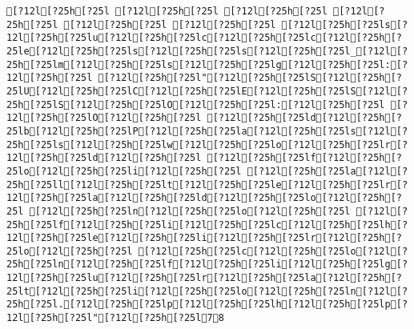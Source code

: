 \documentclass{scrartcl}
\begin{document}
\begin{Verbatim}
[?12l[?25h[?25l [?12l[?25h[?25l [?12l[?25h[?25l [?12l[?25h[?25l [?12l[?25h[?25l [?12l[?25h[?25l [?12l[?25h[?25ls[?12l[?25h[?25lu[?12l[?25h[?25lc[?12l[?25h[?25lc[?12l[?25h[?25le[?12l[?25h[?25ls[?12l[?25h[?25ls[?12l[?25h[?25l_[?12l[?25h[?25lm[?12l[?25h[?25ls[?12l[?25h[?25lg[?12l[?25h[?25l:[?12l[?25h[?25l [?12l[?25h[?25l"[?12l[?25h[?25lS[?12l[?25h[?25lU[?12l[?25h[?25lC[?12l[?25h[?25lE[?12l[?25h[?25lS[?12l[?25h[?25lS[?12l[?25h[?25lO[?12l[?25h[?25l:[?12l[?25h[?25l [?12l[?25h[?25lO[?12l[?25h[?25l [?12l[?25h[?25ld[?12l[?25h[?25lb[?12l[?25h[?25lP[?12l[?25h[?25la[?12l[?25h[?25ls[?12l[?25h[?25ls[?12l[?25h[?25lw[?12l[?25h[?25lo[?12l[?25h[?25lr[?12l[?25h[?25ld[?12l[?25h[?25l [?12l[?25h[?25lf[?12l[?25h[?25lo[?12l[?25h[?25li[?12l[?25h[?25l [?12l[?25h[?25la[?12l[?25h[?25ll[?12l[?25h[?25lt[?12l[?25h[?25le[?12l[?25h[?25lr[?12l[?25h[?25la[?12l[?25h[?25ld[?12l[?25h[?25lo[?12l[?25h[?25l [?12l[?25h[?25ln[?12l[?25h[?25lo[?12l[?25h[?25l [?12l[?25h[?25lf[?12l[?25h[?25li[?12l[?25h[?25lc[?12l[?25h[?25lh[?12l[?25h[?25le[?12l[?25h[?25li[?12l[?25h[?25lr[?12l[?25h[?25lo[?12l[?25h[?25l [?12l[?25h[?25lc[?12l[?25h[?25lo[?12l[?25h[?25ln[?12l[?25h[?25lf[?12l[?25h[?25li[?12l[?25h[?25lg[?12l[?25h[?25lu[?12l[?25h[?25lr[?12l[?25h[?25la[?12l[?25h[?25lt[?12l[?25h[?25li[?12l[?25h[?25lo[?12l[?25h[?25ln[?12l[?25h[?25l.[?12l[?25h[?25lp[?12l[?25h[?25lh[?12l[?25h[?25lp[?12l[?25h[?25l"[?12l[?25h[?25l78


\end{Verbatim}
\end{document}
